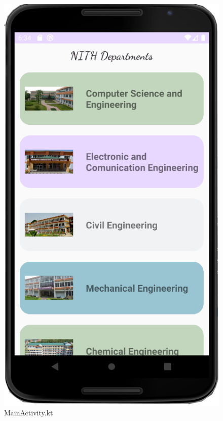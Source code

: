 \documentclass[11pt,a4paper]{report}
\begin{document}
  \begin{figure}[H]
    \centering
    \begin{minipage}[b]{0.3\textwidth}
      \includegraphics[width=\textwidth]{./img/PREVIEW1.png}
      \caption{MainActivity.kt}
    \end{minipage}
    \hfill
    \begin{minipage}[b]{0.3\textwidth}

\end{minipage}
\end{figure}
\end{document}
